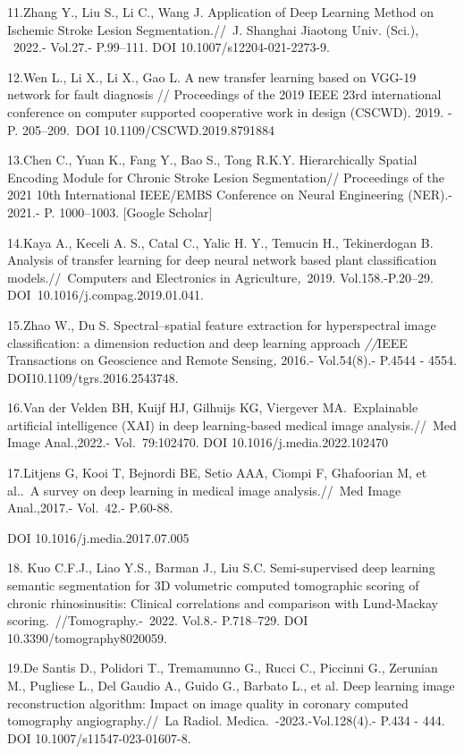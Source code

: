 11.Zhang Y., Liu S., Li C., Wang J. Application of Deep Learning Method
on Ischemic Stroke Lesion Segmentation.//~J. Shanghai Jiaotong Univ.
(Sci.), ~2022.- Vol.27.- P.99--111. DOI 10.1007/s12204-021-2273-9.~

12.Wen L., Li X., Li X., Gao L. A new transfer learning based on VGG-19
network for fault diagnosis // Proceedings of the 2019 IEEE 23rd
international conference on computer supported cooperative work in
design (CSCWD). 2019. - P. 205--209.~DOI 10.1109/CSCWD.2019.8791884

13.Chen C., Yuan K., Fang Y., Bao S., Tong R.K.Y. Hierarchically Spatial
Encoding Module for Chronic Stroke Lesion Segmentation// Proceedings of
the 2021 10th International IEEE/EMBS Conference on Neural Engineering
(NER).- 2021.- P. 1000--1003. {[}Google Scholar{]}

14.Kaya A., Keceli A. S., Catal C., Yalic H. Y., Temucin H.,
Tekinerdogan B. Analysis of transfer learning for deep neural network
based plant classification models.//~Computers and Electronics in
Agriculture\emph{,~}2019. Vol.158.-P.20--29.
DOI~10.1016/j.compag.2019.01.041.~

15.Zhao W., Du S. Spectral--spatial feature extraction for hyperspectral
image classification: a dimension reduction and deep learning approach
\emph{//}IEEE Transactions on Geoscience and Remote Sensing\emph{,}
2016.- Vol.54(8).- P.4544 - 4554. DOI10.1109/tgrs.2016.2543748.~

16.Van der Velden BH, Kuijf HJ, Gilhuijs KG, Viergever MA.~Explainable
artificial intelligence (XAI) in deep learning-based medical image
analysis.//~Med Image Anal.,2022.- Vol.~79:102470. DOI
10.1016/j.media.2022.102470

17.Litjens G, Kooi T, Bejnordi BE, Setio AAA, Ciompi F, Ghafoorian M, et
al..~A survey on deep learning in medical image analysis.//~Med Image
Anal.,2017.- Vol.~42.- P.60-88.

DOI 10.1016/j.media.2017.07.005

18. Kuo C.F.J., Liao Y.S., Barman J., Liu S.C. Semi-supervised deep
learning semantic segmentation for 3D volumetric computed tomographic
scoring of chronic rhinosinusitis: Clinical correlations and comparison
with Lund-Mackay scoring.~//Tomography.-\emph{~}2022. Vol.8.-
P.718--729. DOI 10.3390/tomography8020059.~

19.De Santis D., Polidori T., Tremamunno G., Rucci C., Piccinni G.,
Zerunian M., Pugliese L., Del Gaudio A., Guido G., Barbato L., et al.
Deep learning image reconstruction algorithm: Impact on image quality in
coronary computed tomography angiography.//~La Radiol.
Medica.~-2023.-Vol.128(4).- P.434 - 444. DOI
10.1007/s11547-023-01607-8.~

